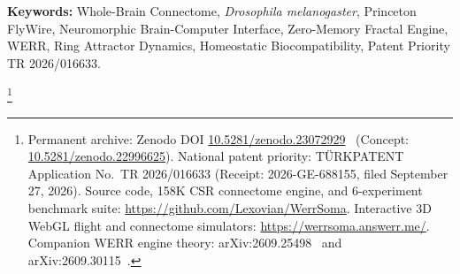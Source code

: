 \documentclass[10pt,twocolumn]{article}
\newcommand\blfootnote[1]{%
  \begingroup
  \renewcommand\thefootnote{}\footnote{#1}%
  \addtocounter{footnote}{-1}%
  \endgroup
}
\begin{document}
\begin{abstract}
\vspace{0.15cm}
\textbf{\textit{\"Ozet (Extended Turkish Abstract)}---Yapay karar verme sistemlerinin biyolojik sinir dokular\i yla entegrasyonu; milisaniye-alt\i{} tepki s\"uresi, s\i f\i r bellek y\"uk\"u ve biyofiziksel homeostaza tam uyum gerektirir. Bu \c{c}al\i\c{s}mada, Princeton FlyWire konsorsiyumu taraf\i ndan haritaland\i r\i lan 158.262 n\"oron ve 3.990.039 kimyasal sinapsl\i{} tam \textit{Drosophila melanogaster} (sirke sine\u{g}i) konnektomunu, 1.024 pinli implante edilebilir \textbf{WERR} n\"oromorfik fraktal yard\i mc\i{} i\c{s}lemcisiyle birle\c{s}tiren \textbf{WerrSoma} biyo-sentetik beyin-makine aray\"uz\"u sunulmaktad\i r. A\u{g}\i r tens\"or matrisleri yerine yordamsal s\i n\i r dinamikleri ve polinomiyal ka\c{c}\i\c{s} y\"or\"ungelerinden ($\partial \mathcal{M}$) anl\i k Sistem-1 refleks kararlar\i{} \"ureten bu mimari, 0 Byte VRAM kullan\i r. Ellipsoid Body (EB), Descending Motor Neurons (DN) ve Mushroom Bodies (MB) b\"olgelerine yerle\c{s}tirilen 4 mikro-elektrot ucu \"uzerinden y\"ur\"ut\"ulen 6 ayr\i{} deneysel protokol sonucunda; \%100.0 sinaptik iletim sadakati ($15.83 \pm 0.51$~mV), biyolojik GABAerjik ara n\"oronlar\i n \%38.58'lik dengeleyici fren ak\i m\i yla zar potansiyelini $-53.93$~mV d\"uzeyinde kilitleyerek epileptik n\"obetleri \"onlemesi (Kararl\i l\i k Endeksi: $0.965$), $3.671$~ms u\c{c}tan uca refleks gecikmesiyle \%94.67 u\c{c}u\c{s} manevra isabeti, $1.23\ \mu\text{W}$ bazal g\"u\c{c} t\"uketimi ($\Delta T = +0.0012^\circ\text{C}$ \i s\i l art\i\c{s}), \%70.10 Shannon n\"oral kodlama verimlili\u{g}i ($1.302$~bit/sembol) ve \%25 elektrot kayb\i nda dahi $>\%78$ y\"onlendirme ba\c{s}ar\i s\i{} do\u{g}rulanm\i\c{s}t\i r.}
\end{abstract}

\vspace{0.15cm}
\noindent\textbf{Keywords:} Whole-Brain Connectome, \textit{Drosophila melanogaster}, Princeton FlyWire, Neuromorphic Brain-Computer Interface, Zero-Memory Fractal Engine, WERR, Ring Attractor Dynamics, Homeostatic Biocompatibility, Patent Priority TR 2026/016633.

\blfootnote{Permanent archive: Zenodo DOI \href{https://doi.org/10.5281/zenodo.23072929}{10.5281/zenodo.23072929}~\cite{dagli2026werrsoma_zenodo} (Concept: \href{https://doi.org/10.5281/zenodo.22996625}{10.5281/zenodo.22996625}). National patent priority: T\"URKPATENT Application No.\ TR 2026/016633 (Receipt: 2026-GE-688155, filed September 27, 2026). Source code, 158K CSR connectome engine, and 6-experiment benchmark suite: \url{https://github.com/Lexovian/WerrSoma}. Interactive 3D WebGL flight and connectome simulators: \url{https://werrsoma.answerr.me/}. Companion WERR engine theory: arXiv:2609.25498~\cite{dagli2026werr} and arXiv:2609.30115~\cite{dagli2026oed}.}
\end{document}
